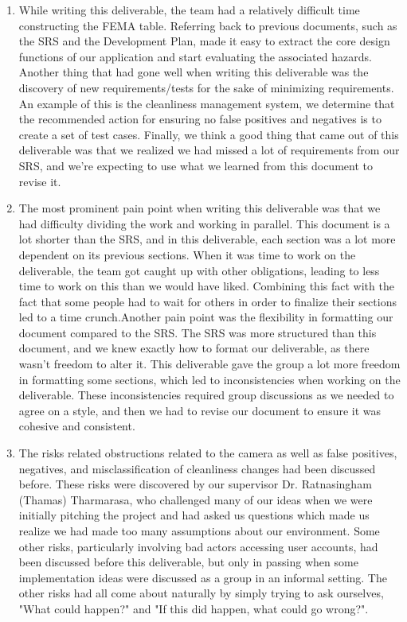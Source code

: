 \documentclass{article}
\begin{document}
\begin{enumerate}
    \item While writing this deliverable, the team had a relatively difficult time constructing the FEMA table. Referring back to previous documents, such as the SRS and the Development Plan, made it easy to extract the core design functions of our application and start evaluating the associated hazards. Another thing that had gone well when writing this deliverable was the discovery of new requirements/tests for the sake of minimizing requirements. An example of this is the cleanliness management system, we determine that the recommended action for ensuring no false positives and negatives is to create a set of test cases. Finally, we think a good thing that came out of this deliverable was that we realized we had missed a lot of requirements from our SRS, and we're expecting to use what we learned from this document to revise it.
    
    \item The most prominent pain point when writing this deliverable was that we had difficulty dividing the work and working in parallel. This document is a lot shorter than the SRS, and in this deliverable, each section was a lot more dependent on its previous sections. When it was time to work on the deliverable, the team got caught up with other obligations, leading to less time to work on this than we would have liked. Combining this fact with the fact that some people had to wait for others in order to finalize their sections led to a time crunch.\newline Another pain point was the flexibility in formatting our document compared to the SRS. The SRS was more structured than this document, and we knew exactly how to format our deliverable, as there wasn't freedom to alter it. This deliverable gave the group a lot more freedom in formatting some sections, which led to inconsistencies when working on the deliverable. These inconsistencies required group discussions as we needed to agree on a style, and then we had to revise our document to ensure it was cohesive and consistent. 
    
    \item The risks related obstructions related to the camera as well as false positives, negatives, and misclassification of cleanliness changes had been discussed before. These risks were discovered by our supervisor Dr. Ratnasingham (Thamas) Tharmarasa, who challenged many of our ideas when we were initially pitching the project and had asked us questions which made us realize we had made too many assumptions about our environment. Some other risks, particularly involving bad actors accessing user accounts, had been discussed before this deliverable, but only in passing when some implementation ideas were discussed as a group in an informal setting. The other risks had all come about naturally by simply trying to ask ourselves, "What could happen?" and "If this did happen, what could go wrong?".
    

\end{enumerate}
\end{document}
